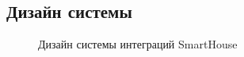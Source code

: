 \documentclass{article}
\begin{document}
\subsection{Дизайн системы}
\begin{figure}[H]
\caption{Дизайн системы интеграций SmartHouse}
\end{figure}
\end{document}

